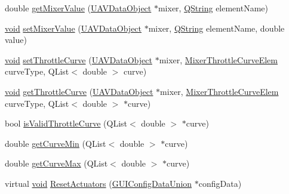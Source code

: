 \begin{DoxyCompactItemize}
\item 
double \hyperlink{group___config_plugin_ga4043ba19db9003bbebdc196ccc54bc72}{get\-Mixer\-Value} (\hyperlink{class_u_a_v_data_object}{\-U\-A\-V\-Data\-Object} $\ast$mixer, \hyperlink{group___u_a_v_objects_plugin_gab9d252f49c333c94a72f97ce3105a32d}{\-Q\-String} element\-Name)
\item 
\hyperlink{group___u_a_v_objects_plugin_ga444cf2ff3f0ecbe028adce838d373f5c}{void} \hyperlink{group___config_plugin_ga7f2b470b423569fa6b07c81e21288e28}{set\-Mixer\-Value} (\hyperlink{class_u_a_v_data_object}{\-U\-A\-V\-Data\-Object} $\ast$mixer, \hyperlink{group___u_a_v_objects_plugin_gab9d252f49c333c94a72f97ce3105a32d}{\-Q\-String} element\-Name, double value)
\item 
\hyperlink{group___u_a_v_objects_plugin_ga444cf2ff3f0ecbe028adce838d373f5c}{void} \hyperlink{group___config_plugin_gaa0e88bc5f48d30ef5c1ef359ab2803ee}{set\-Throttle\-Curve} (\hyperlink{class_u_a_v_data_object}{\-U\-A\-V\-Data\-Object} $\ast$mixer, \hyperlink{group___config_plugin_gade5fe5fce28e87dce288d08dcf87a101}{\-Mixer\-Throttle\-Curve\-Elem} curve\-Type, \-Q\-List$<$ double $>$ curve)
\item 
\hyperlink{group___u_a_v_objects_plugin_ga444cf2ff3f0ecbe028adce838d373f5c}{void} \hyperlink{group___config_plugin_ga281f6c86ad38eaab7bb5722f91ea2242}{get\-Throttle\-Curve} (\hyperlink{class_u_a_v_data_object}{\-U\-A\-V\-Data\-Object} $\ast$mixer, \hyperlink{group___config_plugin_gade5fe5fce28e87dce288d08dcf87a101}{\-Mixer\-Throttle\-Curve\-Elem} curve\-Type, \-Q\-List$<$ double $>$ $\ast$curve)
\item 
bool \hyperlink{group___config_plugin_ga92da8cda852e8b2f1974cac57fbaa99f}{is\-Valid\-Throttle\-Curve} (\-Q\-List$<$ double $>$ $\ast$curve)
\item 
double \hyperlink{group___config_plugin_gae535c3bae8862f72e05f9247a3921b78}{get\-Curve\-Min} (\-Q\-List$<$ double $>$ $\ast$curve)
\item 
double \hyperlink{group___config_plugin_ga7d87a7cb73a87543dc94b23e4e4132d8}{get\-Curve\-Max} (\-Q\-List$<$ double $>$ $\ast$curve)
\item 
virtual \hyperlink{group___u_a_v_objects_plugin_ga444cf2ff3f0ecbe028adce838d373f5c}{void} \hyperlink{group___config_plugin_ga583ace2f123682515cbed3f87bd6e9fc}{\-Reset\-Actuators} (\hyperlink{union_g_u_i_config_data_union}{\-G\-U\-I\-Config\-Data\-Union} $\ast$config\-Data)
\end{DoxyCompactItemize}
